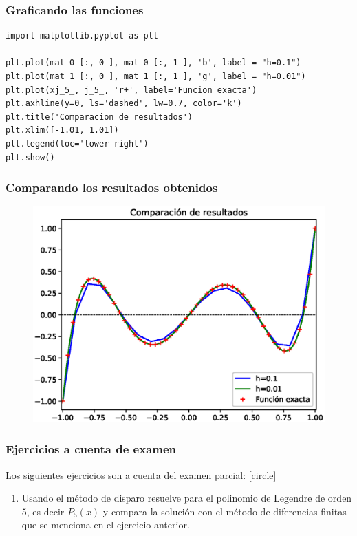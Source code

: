 \begin{frame}
\frametitle{Graficando las funciones}
\begin{lstlisting}[caption=Rutina de graficación, style=FormattedNumber, basicstyle=\linespread{1.1}\ttfamily=\small, columns=fullflexible]
import matplotlib.pyplot as plt

plt.plot(mat_0_[:,_0_], mat_0_[:,_1_], 'b', label = "h=0.1")
plt.plot(mat_1_[:,_0_], mat_1_[:,_1_], 'g', label = "h=0.01")
plt.plot(xj_5_, j_5_, 'r+', label='Funcion exacta')
plt.axhline(y=0, ls='dashed', lw=0.7, color='k')
plt.title('Comparacion de resultados')
plt.xlim([-1.01, 1.01])
plt.legend(loc='lower right')
plt.show()
\end{lstlisting}
\end{frame}
\begin{frame}
\frametitle{Comparando los resultados obtenidos}
\begin{figure}
   \centering
   \includegraphics[scale=0.6]{Imagenes/ejercicio_Legendre_01.eps}
\end{figure}
\end{frame}
\begin{frame}
\frametitle{Ejercicios a cuenta de examen}
Los siguientes ejercicios son a cuenta del examen parcial:
[circle]
\begin{enumerate}[<+->]
\item Usando el método de disparo resuelve para el polinomio de Legendre de orden $5$, es decir $P_{5}(x)$ y compara la solución con el método de diferencias finitas que se menciona en el ejercicio anterior.
\seti
\end{enumerate}
\end{frame}

